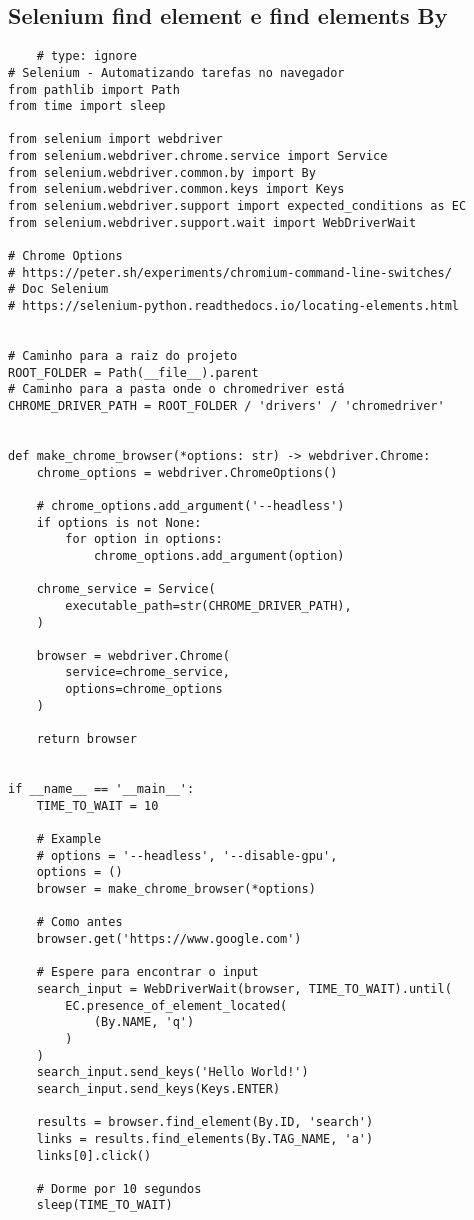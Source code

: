 \documentclass{article}
\begin{document}
\subsection{Selenium find element e find elements By}
\begin{lstlisting}
    # type: ignore
# Selenium - Automatizando tarefas no navegador
from pathlib import Path
from time import sleep

from selenium import webdriver
from selenium.webdriver.chrome.service import Service
from selenium.webdriver.common.by import By
from selenium.webdriver.common.keys import Keys
from selenium.webdriver.support import expected_conditions as EC
from selenium.webdriver.support.wait import WebDriverWait

# Chrome Options
# https://peter.sh/experiments/chromium-command-line-switches/
# Doc Selenium
# https://selenium-python.readthedocs.io/locating-elements.html


# Caminho para a raiz do projeto
ROOT_FOLDER = Path(__file__).parent
# Caminho para a pasta onde o chromedriver está
CHROME_DRIVER_PATH = ROOT_FOLDER / 'drivers' / 'chromedriver'


def make_chrome_browser(*options: str) -> webdriver.Chrome:
    chrome_options = webdriver.ChromeOptions()

    # chrome_options.add_argument('--headless')
    if options is not None:
        for option in options:
            chrome_options.add_argument(option)

    chrome_service = Service(
        executable_path=str(CHROME_DRIVER_PATH),
    )

    browser = webdriver.Chrome(
        service=chrome_service,
        options=chrome_options
    )

    return browser


if __name__ == '__main__':
    TIME_TO_WAIT = 10

    # Example
    # options = '--headless', '--disable-gpu',
    options = ()
    browser = make_chrome_browser(*options)

    # Como antes
    browser.get('https://www.google.com')

    # Espere para encontrar o input
    search_input = WebDriverWait(browser, TIME_TO_WAIT).until(
        EC.presence_of_element_located(
            (By.NAME, 'q')
        )
    )
    search_input.send_keys('Hello World!')
    search_input.send_keys(Keys.ENTER)

    results = browser.find_element(By.ID, 'search')
    links = results.find_elements(By.TAG_NAME, 'a')
    links[0].click()

    # Dorme por 10 segundos
    sleep(TIME_TO_WAIT)
\end{lstlisting}
\end{document}
